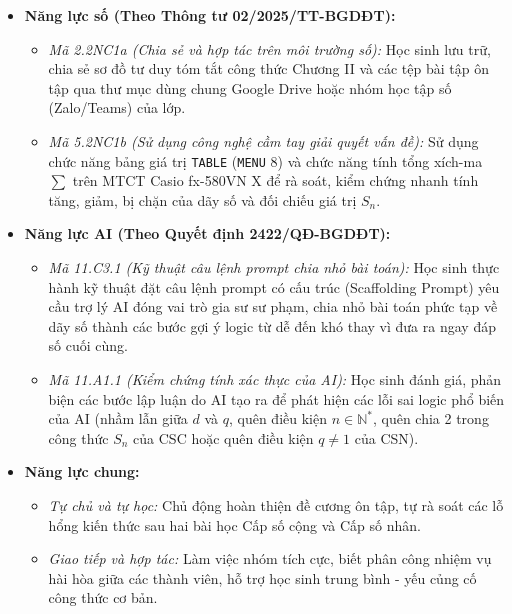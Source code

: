 \documentclass[12pt, a4paper]{article}
\begin{document}
\begin{itemize}[leftmargin=1.2cm]
    \item \textbf{Năng lực số (Theo Thông tư 02/2025/TT-BGDĐT):}
    \begin{itemize}[leftmargin=0.6cm]
        \item \textit{Mã 2.2NC1a (Chia sẻ và hợp tác trên môi trường số):} Học sinh lưu trữ, chia sẻ sơ đồ tư duy tóm tắt công thức Chương II và các tệp bài tập ôn tập qua thư mục dùng chung Google Drive hoặc nhóm học tập số (Zalo/Teams) của lớp.
        \item \textit{Mã 5.2NC1b (Sử dụng công nghệ cầm tay giải quyết vấn đề):} Sử dụng chức năng bảng giá trị \texttt{TABLE} (\texttt{MENU} $8$) và chức năng tính tổng xích-ma $\sum$ trên MTCT Casio fx-580VN X để rà soát, kiểm chứng nhanh tính tăng, giảm, bị chặn của dãy số và đối chiếu giá trị $S_n$.
    \end{itemize}

    \item \textbf{Năng lực AI (Theo Quyết định 2422/QĐ-BGDĐT):}
    \begin{itemize}[leftmargin=0.6cm]
        \item \textit{Mã 11.C3.1 (Kỹ thuật câu lệnh prompt chia nhỏ bài toán):} Học sinh thực hành kỹ thuật đặt câu lệnh prompt có cấu trúc (Scaffolding Prompt) yêu cầu trợ lý AI đóng vai trò gia sư sư phạm, chia nhỏ bài toán phức tạp về dãy số thành các bước gợi ý logic từ dễ đến khó thay vì đưa ra ngay đáp số cuối cùng.
        \item \textit{Mã 11.A1.1 (Kiểm chứng tính xác thực của AI):} Học sinh đánh giá, phản biện các bước lập luận do AI tạo ra để phát hiện các lỗi sai logic phổ biến của AI (nhầm lẫn giữa $d$ và $q$, quên điều kiện $n \in \mathbb{N}^*$, quên chia 2 trong công thức $S_n$ của CSC hoặc quên điều kiện $q \neq 1$ của CSN).
    \end{itemize}

    \item \textbf{Năng lực chung:}
    \begin{itemize}[leftmargin=0.6cm]
        \item \textit{Tự chủ và tự học:} Chủ động hoàn thiện đề cương ôn tập, tự rà soát các lỗ hổng kiến thức sau hai bài học Cấp số cộng và Cấp số nhân.
        \item \textit{Giao tiếp và hợp tác:} Làm việc nhóm tích cực, biết phân công nhiệm vụ hài hòa giữa các thành viên, hỗ trợ học sinh trung bình - yếu củng cố công thức cơ bản.
    \end{itemize}
\end{itemize}
\end{document}
